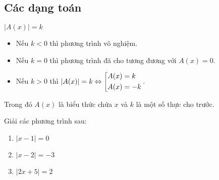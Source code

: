 \subsection{Các dạng toán}
\begin{dang}{$|A(x)|=k$}
	\begin{itemize}
		\item Nếu $k<0$ thì phương trình vô nghiệm.
		\item Nếu $k=0$ thì phương trình đã cho tương đương với $A(x)=0$.
		\item Nếu $k>0$ thì $|A(x)|=k\Leftrightarrow \left[\begin{aligned}&A(x)=k\\&A(x)=-k\end{aligned}\right.$.
	\end{itemize}
	Trong đó $A(x)$ là biểu thức chứa $x$ và $k$ là một số thực cho trước.
\end{dang}
\begin{vd}%
	Giải các phương trình sau:
	\begin{enumerate}
		\item $|x-1|=0$
		\item $|x-2|=-3$
		\item $|2x+5|=2$
	\end{enumerate}
\end{vd}
